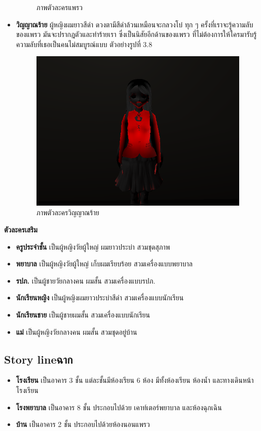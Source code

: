 \begin{itemize}
\begin{figure}[h]
        \caption{ภาพตัวละครแพรว}\label{PrawCharacter}
    \end{figure}
    \item \textbf{วิญญาณร้าย} ผู้หญิงผมยาวสีดำ ดวงตามีสีดำล้วนเหมือนจะกลวงโบ๋ ทุก ๆ ครั้งที่เราจะรู้ความลับของแพรว มันจะปรากฎตัวและทำร้ายเรา ซึ่งเป็นนิสัยอีกด้านของแพรว ที่ไม่ต้องการให้ใครมารับรู้ความลับที่เธอเป็นคนไม่สมบูรณ์แบบ ตัวอย่างรูปที่ 3.8
    \begin{figure}[h]
        \centering
        \includegraphics[scale=0.5]{Images/ghost image.png}
        \caption{ภาพตัวละครวิญญาณร้าย}\label{GhostCharacter}
    \end{figure}
\end{itemize}


\subitem \textbf{ตัวละครเสริม}
\begin{itemize}
    \item \textbf{ครูประจำชั้น} เป็นผู้หญิงวัยผู้ใหญ่  ผมยาวประบ่า สวมชุดสุภาพ
    \item \textbf{พยาบาล} เป็นผู้หญิงวัยผู้ใหญ่ เก็บผมเรียบร้อย สวมเครื่องแบบพยาบาล
    \item \textbf{รปภ.} เป็นผู้ชายวัยกลางคน ผมสั้น สวมเครื่องแบบรปภ.
    \item \textbf{นักเรียนหญิง} เป็นผู้หญิงผมยาวประบ่าสีดำ สวมเครื่องแบบนักเรียน
    \item \textbf{นักเรียนชาย} เป็นผู้ชายผมสั้น  สวมเครื่องแบบนักเรียน
    \item \textbf{แม่} เป็นผู้หญิงวัยกลางคน ผมสั้น สวมชุดอยู่บ้าน
\end{itemize}

\subsection{\ifenglish Story line\else ฉาก\fi }
\begin{itemize}
    \item \textbf{โรงเรียน} เป็นอาคาร 3 ชั้น แต่ละชั้นมีห้องเรียน 6 ห้อง มีทั้งห้องเรียน ห้องน้ำ และทางเดินหน้าโรงเรียน
    \item \textbf{โรงพยาบาล} เป็นอาคาร 8 ชั้น ประกอบไปด้วย เคาท์เตอร์พยาบาล และห้องฉุกเฉิน
    \item \textbf{บ้าน} เป็นอาคาร 2 ชั้น ประกอบไปด้วยห้องนอนแพรว
\end{itemize}

